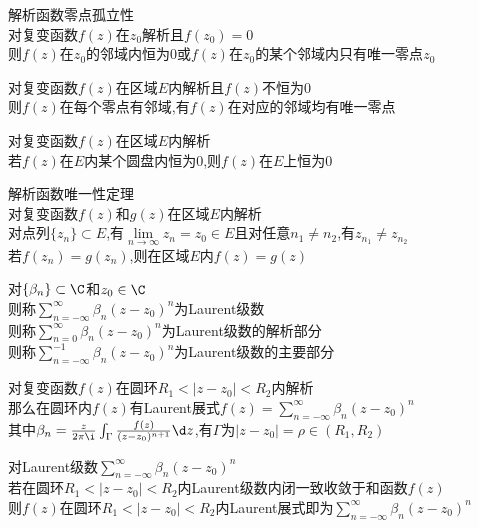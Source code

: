 \begin{dingli}
解析函数零点孤立性\\
对复变函数$f(z)$在$z_0$解析且$f(z_0)=0$\\
则$f(z)$在$z_0$的邻域内恒为$0$或$f(z)$在$z_0$的某个邻域内只有唯一零点$z_0$
\end{dingli}

\begin{tuilun}
对复变函数$f(z)$在区域$E$内解析且$f(z)$不恒为$0$\\
则$f(z)$在每个零点有邻域,有$f(z)$在对应的邻域均有唯一零点
\end{tuilun}

\begin{dingli}
对复变函数$f(z)$在区域$E$内解析\\
若$f(z)$在$E$内某个圆盘内恒为$0$,则$f(z)$在$E$上恒为$0$
\end{dingli}

\begin{dingli}
解析函数唯一性定理\\
对复变函数$f(z)$和$g(z)$在区域$E$内解析\\
对点列$\{z_n\}\subset E$,有$\lim\limits_{n\to \infty}z_n=z_0\in E$且对任意$n_1\neq n_2$,有$z_{n_1}\neq z_{n_2}$\\
若$f(z_n)=g(z_n)$,则在区域$E$内$f(z)=g(z)$
\end{dingli}

\begin{dingyi}
对$\{\beta_n\}\subset\C$和$z_0\in \C$\\
则称$\sum\limits_{n=-\infty}^{\infty}\beta_n(z-z_0)^n$为Laurent级数\\
则称$\sum\limits_{n=0}^{\infty}\beta_n(z-z_0)^n$为Laurent级数的解析部分\\ 
则称$\sum\limits_{n=-\infty}^{-1}\beta_n(z-z_0)^n$为Laurent级数的主要部分
\end{dingyi}

\begin{dingli}
对复变函数$f(z)$在圆环$R_1<|z-z_0|<R_2$内解析\\
那么在圆环内$f(z)$有Laurent展式$f(z)=\sum\limits_{n=-\infty}^{\infty}\beta_n(z-z_0)^n$\\
其中$\beta_n=\frac{z}{2\pi\i}\int_{\Gamma}\frac{f(z)}{(z-z_0)^{n+1}}\d z$,有$\Gamma$为$|z-z_0|=\rho\in (R_1,R_2)$
\end{dingli}

\begin{dingli}
对Laurent级数$\sum\limits_{n=-\infty}^{\infty}\beta_n(z-z_0)^n$\\
若在圆环$R_1<|z-z_0|<R_2$内Laurent级数内闭一致收敛于和函数$f(z)$\\
则$f(z)$在圆环$R_1<|z-z_0|<R_2$内Laurent展式即为$\sum\limits_{n=-\infty}^{\infty}\beta_n(z-z_0)^n$
\end{dingli}

